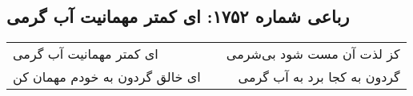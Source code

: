 \begin{center}
\section*{رباعی شماره ۱۷۵۲: ای کمتر مهمانیت آب گرمی}
\label{sec:1752}
\begin{longtable}{l p{0.5cm} r}
ای کمتر مهمانیت آب گرمی
&&
کز لذت آن مست شود بی‌شرمی
\\
ای خالق گردون به خودم مهمان کن
&&
گردون به کجا برد به آب گرمی
\\
\end{longtable}
\end{center}
